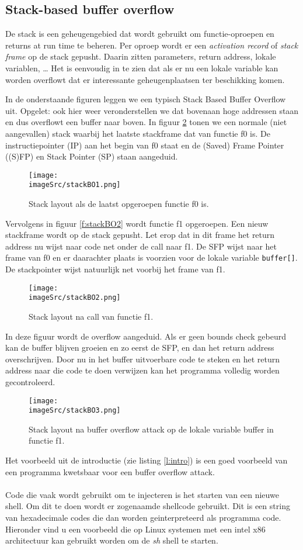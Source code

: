 \documentclass[../main.tex]{subfiles}
\begin{document}
\subsection{Stack-based buffer overflow}
De stack is een geheugengebied dat wordt gebruikt om functie-oproepen en returns at run time te beheren.
Per oproep wordt er een \emph{activation record} of \emph{stack frame} op de stack gepusht. Daarin zitten parameters, return address, lokale variablen, \ldots
Het is eenvoudig in te zien dat als er nu een lokale variable kan worden overflowt dat er interessante geheugenplaatsen ter beschikking komen.

In de onderstaande figuren leggen we een typisch Stack Based Buffer Overflow uit. Opgelet: ook hier weer veronderstellen we dat bovenaan hoge addressen staan en dus overflowt een buffer naar boven.
In figuur \ref{f:stackBO1} tonen we een normale (niet aangevallen) stack waarbij het laatste stackframe dat van functie f0 is. De instructiepointer (IP) aan het begin van f0 staat en de (Saved) Frame Pointer ((S)FP) en Stack Pointer (SP) staan aangeduid.
\begin{figure}
\centering
\texttt{[image: \\imageSrc/stackBO1.png]}
\caption{Stack layout als de laatst opgeroepen functie f0 is.}
\label{f:stackBO1}
\end{figure}

Vervolgens in figuur \ref{f:stackBO2} wordt functie f1 opgeroepen. Een nieuw stackframe wordt op de stack gepusht. Let erop dat in dit frame het return address nu wijst naar code net onder de call naar f1. De SFP wijst naar het frame van f0 en er daarachter plaats is voorzien voor de lokale variable \lstinline[style=cstyle]{buffer[]}. De stackpointer wijst natuurlijk net voorbij het frame van f1.
\begin{figure}
\centering
\texttt{[image: \\imageSrc/stackBO2.png]}
\caption{Stack layout na call van functie f1.}
\label{f:stackBO1}
\end{figure}

In deze figuur wordt de overflow aangeduid. Als er geen bounds check gebeurd kan de buffer blijven groeien en zo eerst de SFP, en dan het return address overschrijven. Door nu in het buffer uitvoerbare code te steken en het return address naar die code te doen verwijzen kan het programma volledig worden gecontroleerd.
\begin{figure}
\centering
\texttt{[image: \\imageSrc/stackBO3.png]}
\caption{Stack layout na buffer overflow attack op de lokale variable buffer in functie f1.}
\label{f:stackBO3}
\end{figure}
Het voorbeeld uit de introductie (zie listing \ref{l:intro}) is een goed voorbeeld van een programma kwetsbaar voor een buffer overflow attack.
\\\\
Code die vaak wordt gebruikt om te injecteren is het starten van een nieuwe shell.
Om dit te doen wordt er zogenaamde shellcode gebruikt.
Dit is een string van hexadecimale codes die dan worden geinterpreteerd als programma code.
Hieronder vind u een voorbeeld die op Linux systemen met een intel x86 architectuur kan gebruikt worden om de \emph{sh} shell te starten.
\end{document}
